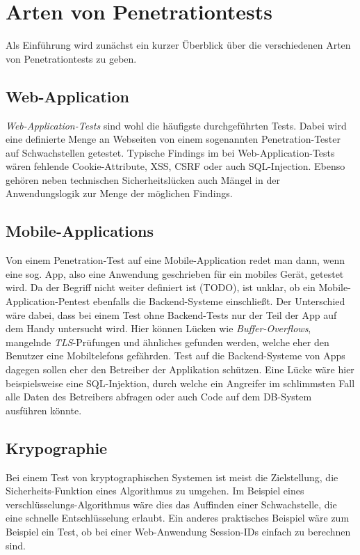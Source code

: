 \chapter{Arten von Penetrationtests}
Als Einführung wird zunächst ein kurzer Überblick über die verschiedenen Arten von Penetrationtests zu geben.

	\section{Web-Application}
	\textit{Web-Application-Tests} sind wohl die häufigste durchgeführten Tests. Dabei wird eine definierte Menge an Webseiten von einem sogenannten Penetration-Tester auf Schwachstellen getestet. Typische Findings im bei Web-Application-Tests wären fehlende Cookie-Attribute, XSS, CSRF oder auch SQL-Injection. Ebenso gehören neben technischen Sicherheitslücken auch Mängel in der Anwendungslogik zur Menge der möglichen Findings.
	
	\section{Mobile-Applications}
	Von einem Penetration-Test auf eine Mobile-Application redet man dann, wenn eine sog. App, also eine Anwendung geschrieben für ein mobiles Gerät, getestet wird. Da der Begriff nicht weiter definiert ist (TODO), ist unklar, ob ein Mobile-Application-Pentest ebenfalls die Backend-Systeme einschließt. Der Unterschied wäre dabei, dass bei einem Test ohne Backend-Tests nur der Teil der App auf dem Handy untersucht wird. Hier können Lücken wie \textit{Buffer-Overflows}, mangelnde \textit{TLS}-Prüfungen und ähnliches gefunden werden, welche eher den Benutzer eine Mobiltelefons gefährden. Test auf die Backend-Systeme von Apps dagegen sollen eher den Betreiber der Applikation schützen. Eine Lücke wäre hier beispielsweise eine SQL-Injektion, durch welche ein Angreifer im schlimmsten Fall alle Daten des Betreibers abfragen oder auch Code auf dem DB-System ausführen könnte.
	
	\section{Krypographie}
	Bei einem Test von kryptographischen Systemen ist meist die Zielstellung, die Sicherheits-Funktion eines Algorithmus zu umgehen. Im Beispiel eines verschlüsselungs-Algorithmus wäre dies das Auffinden einer Schwachstelle, die eine schnelle Entschlüsselung erlaubt. Ein anderes praktisches Beispiel wäre zum Beispiel ein Test, ob bei einer Web-Anwendung Session-IDs einfach zu berechnen sind.
	
